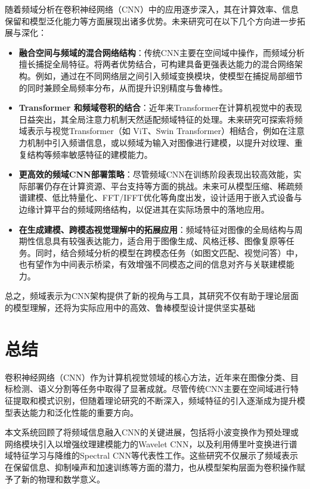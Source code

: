 \documentclass[12pt]{article}
\begin{document}
随着频域分析在卷积神经网络（CNN）中的应用逐步深入，其在计算效率、信息保留和模型泛化能力等方面展现出诸多优势。未来研究可在以下几个方向进一步拓展与深化：

\begin{itemize}
\item \textbf{融合空间与频域的混合网络结构}：传统CNN主要在空间域中操作，而频域分析擅长捕捉全局特征。将两者优势结合，可构建具备更强表达能力的混合网络架构。例如，通过在不同网络层之间引入频域变换模块，使模型在捕捉局部细节的同时兼顾全局频率分布，从而提升识别精度与鲁棒性。

\item \textbf{Transformer 和频域卷积的结合}：近年来Transformer在计算机视觉中的表现日益突出，其全局注意力机制天然适配频域特征的处理。未来研究可探索将频域表示与视觉Transformer（如 ViT、Swin Transformer）相结合，例如在注意力机制中引入频谱信息，或以频域为输入对图像进行建模，以提升对纹理、重复结构等频率敏感特征的建模能力。

\item \textbf{更高效的频域CNN部署策略}：尽管频域CNN在训练阶段表现出较高效能，实际部署仍存在计算资源、平台支持等方面的挑战。未来可从模型压缩、稀疏频谱建模、低比特量化、FFT/IFFT优化等角度出发，设计适用于嵌入式设备与边缘计算平台的频域网络结构，以促进其在实际场景中的落地应用。

\item \textbf{在生成建模、跨模态视觉理解中的拓展应用}：频域特征对图像的全局结构与周期性信息具有较强表达能力，适合用于图像生成、风格迁移、图像复原等任务。同时，结合频域分析的模型在跨模态任务（如图文匹配、视觉问答）中，也有望作为中间表示桥梁，有效增强不同模态之间的信息对齐与关联建模能力。

\end{itemize}

总之，频域表示为CNN架构提供了新的视角与工具，其研究不仅有助于理论层面的模型理解，还将为实际应用中的高效、鲁棒模型设计提供坚实基础


\section{总结}

卷积神经网络（CNN）作为计算机视觉领域的核心方法，近年来在图像分类、目标检测、语义分割等任务中取得了显著成就。尽管传统CNN主要在空间域进行特征提取和模式识别，但随着理论研究的不断深入，频域特征的引入逐渐成为提升模型表达能力和泛化性能的重要方向。

本文系统回顾了将频域信息融入CNN的关键进展，包括将小波变换作为预处理或网络模块引入以增强纹理建模能力的Wavelet CNN，以及利用傅里叶变换进行谱域特征学习与降维的Spectral CNN等代表性工作。这些研究不仅展示了频域表示在保留信息、抑制噪声和加速训练等方面的潜力，也从模型架构层面为卷积操作赋予了新的物理和数学意义。
\end{document}
